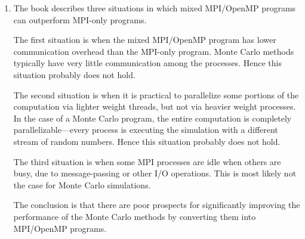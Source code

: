 \begin{enumerate}
From our analysis it appears the functions that are the
best candidates for parallelization with OpenMP pragmas are
{\tt make\_profile} and {\tt get\_names}.

\item The book describes three situations in which mixed MPI/OpenMP programs
      can outperform MPI-only programs.

      The first situation is when the mixed MPI/OpenMP program has lower
      communication overhead than the MPI-only program.
      Monte Carlo methods typically have very little communication among the
      processes. Hence this situation probably does not hold.

      The second situation is when it is practical to parallelize some
      portions of the computation via lighter weight threads, but not via
      heavier weight processes.
      In the case of a Monte Carlo program, the entire computation is
      completely parallelizable---every process is executing the simulation
      with a different stream of random numbers.
      Hence this situation probably does not hold.

      The third situation is when some MPI processes are idle when others
      are busy, due to message-passing or other I/O operations. This is 
      most likely not the case for Monte Carlo simulations.

      The conclusion is that there are poor prospects for significantly
      improving the performance of the Monte Carlo methods by converting
      them into MPI/OpenMP programs.

\end{enumerate}
